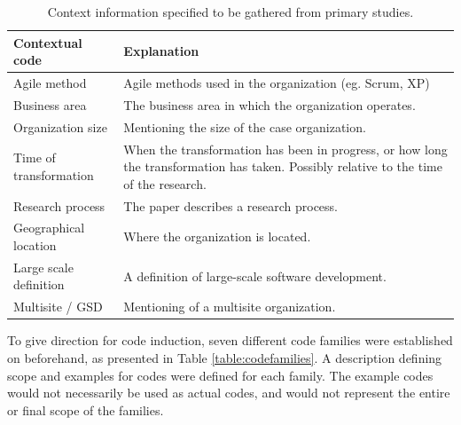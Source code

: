 \begin{table}[h]
    \centering
    \begin{tabular}{ >{\raggedright\arraybackslash}p{}
                     >{\raggedright\arraybackslash}p{} }
        \toprule
        Contextual code     & Explanation   \\
        \midrule

Agile method & Agile methods used in the organization (eg. Scrum, XP) \\

Business area & The business area in which the organization operates. \\

Organization size & Mentioning the size of the case organization. \\

Time of transformation & When the transformation has been in
progress, or how long the transformation has taken. Possibly relative to
the time of the research. \\

Research process & The paper describes a research process. \\

Geographical location & Where the organization is located. \\

Large scale definition & A definition of large-scale software development. \\

Multisite / GSD & Mentioning of a multisite organization. \\

        \bottomrule
    \end{tabular}
    \caption{Context information specified to be gathered from primary studies.}
    \label{table:contextualcodes}
\end{table}

To give direction for code induction, seven different code families were
established on beforehand, as presented in Table \ref{table:codefamilies}. A
description defining scope and examples for codes were defined for each family.
The example codes would not necessarily be used as actual codes, and would not
represent the entire or final scope of the families.

